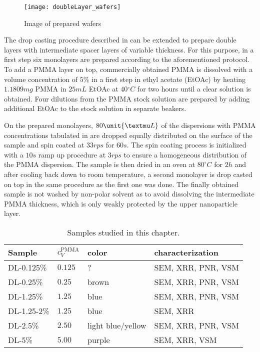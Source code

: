 \documentclass[\main/dresen_thesis.tex]{subfiles}
\begin{document}
  \begin{figure}[tb]
    \centering
    \texttt{[image: doubleLayer\_wafers]}
    \caption{\label{fig:doubleLayers:preparation:waferImage}Image of prepared wafers}
  \end{figure}

  The drop casting procedure described in  can be extended to prepare double layers with intermediate spacer layers of variable thickness.
  For this purpose, in a first step six monolayers are prepared according to the aforementioned protocol.
  To add a PMMA layer on top, commercially obtained PMMA is dissolved with a volume concentration of $5 \%$ in a first step in ethyl acetate (EtOAc) by heating $1.1809 \unit{mg}$ PMMA in $25 \unit{mL}$ EtOAc at $40 \unit{^\circ C}$ for two hours until a clear solution is obtained.
  Four dilutions from the PMMA stock solution are prepared by adding additional EtOAc to the stock solution in separate beakers.

  On the prepared monolayers, $80 \unit{\textmu L}$ of the dispersions with PMMA concentrations tabulated in  are dropped equally distributed on the surface of the sample and spin coated at $33 \unit{rps}$ for $60 \unit{s}$.
  The spin coating process is initialized with a $10 \unit{s}$ ramp up procedure at $3 \unit{rps}$ to ensure a homogeneous distribution of the PMMA dispersion.
  The sample is then dried in an oven at $80 ^\circ C$ for $2 \unit{h}$ and after cooling back down to room temperature, a second monolayer is drop casted on top in the same procedure as the first one was done.
  The finally obtained sample is not washed by non-polar solvent as to avoid dissolving the intermediate PMMA thickness, which is only weakly protected by the upper nanoparticle layer.

  \begin{table}[!htbp]
    \centering
    \caption{\label{tab:doubleLayers:preparation:samples}Samples studied in this chapter.}
    \begin{tabular}{ l | l | l | l}
      \textbf{Sample}  & $c_V^\mathrm{PMMA}$ & color & characterization\\
      \hline
      DL-0.125\%    & $0.125$ & ?               & SEM, XRR, PNR, VSM\\
      DL-0.25\%     & $0.25$ & brown            & SEM, XRR, PNR, VSM\\
      DL-1.25\%     & $1.25$ & blue             & SEM, XRR, PNR, VSM\\
      DL-1.25-2\%   & $1.25$ & blue             & SEM, XRR\\
      DL-2.5\%      & $2.50$ & light blue/yellow& SEM, XRR, PNR, VSM\\
      DL-5\%        & $5.00$ & purple           & SEM, XRR, VSM\\
      \hline
    \end{tabular}
  \end{table}

\end{document}
